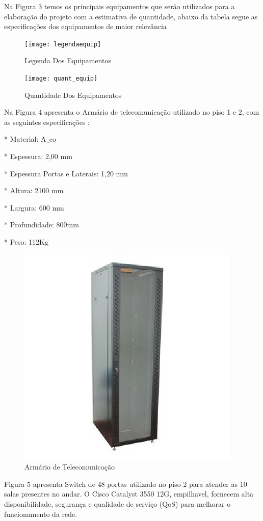 \documentclass[	DIV=calc,%
							paper=a4,%
							fontsize=12pt,%
							onecolumn]{scrartcl}	 					%
\begin{document}
Na Figura 3 temos os principais equipamentos que serão utilizados para a elaboração do
projeto com a estimativa de quantidade, abaixo da tabela segue as especificações dos equipamentos de maior relevância 

\begin{figure}
	\centering
	\texttt{[image: legendaequip]}
	\caption{ Legenda Dos Equipamentos }
	\label{fig:legendaequip}
\end{figure}

\begin{figure}
	\centering
	\texttt{[image: quant\_equip]}
	\caption{Quantidade Dos Equipamentos }
	\label{fig:quantequip}
\end{figure}

Na Figura 4 apresenta o Armário de telecomunicação utilizado no piso 1 e 2, com as seguintes especificações : 

* Material: A¸co

* Espessura: 2,00 mm

* Espessura Portas e Laterais: 1,20 mm

* Altura: 2100 mm

* Largura: 600 mm

* Profundidade: 800mm

* Peso: 112Kg


\begin{figure}
	\centering
	\includegraphics[width=0.7\linewidth]{racktelecom}
	\caption{ Armário de Telecomunicação}
	\label{fig:racktelecom}
\end{figure}


Figura 5 apresenta Switch de 48 portas utilizado no piso 2 para atender as 10 salas
presentes no andar. O Cisco Catalyst 3550 12G, empilhavel, fornecem alta disponibilidade, segurança e qualidade de serviço (QoS) para melhorar o funcionamento da rede. 
\end{document}
